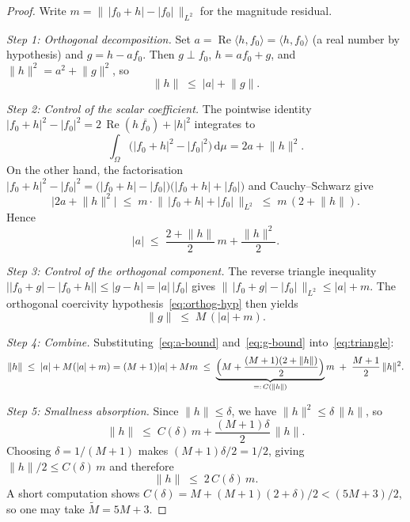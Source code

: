 \documentclass[11pt]{amsart}
\theoremstyle{definition}
\theoremstyle{remark}
\newcommand{\abs}[1]{\lvert #1 \rvert}
\newcommand{\norm}[1]{\lVert #1 \rVert}
\newcommand{\ip}[2]{\langle #1,#2\rangle}
\DeclareMathOperator{\re}{Re}
\newcommand{\dd}{\mathrm{d}}
\begin{document}
\begin{proof}
Write $m = \bigl\|\, \abs{f_0 + h} - \abs{f_0} \,\bigr\|_{L^2}$ for the
magnitude residual.

\medskip
\noindent
\emph{Step 1: Orthogonal decomposition.}\;
Set $a = \re\ip{h}{f_0} = \ip{h}{f_0}$ (a real number by hypothesis) and
$g = h - a f_0$.  Then $g \perp f_0$, $h = af_0 + g$, and
$\norm{h}^2 = a^2 + \norm{g}^2$, so
\begin{equation}\label{eq:triangle}
\norm{h} \;\le\; \abs{a} + \norm{g}.
\end{equation}

\medskip
\noindent
\emph{Step 2: Control of the scalar coefficient.}\;
The pointwise identity
$\abs{f_0 + h}^2 - \abs{f_0}^2
= 2\,\re(h\,\overline{f_0}) + \abs{h}^2$
integrates to
\[
\int_\Omega \bigl(\abs{f_0 + h}^2 - \abs{f_0}^2\bigr)\,\dd\mu
= 2a + \norm{h}^2.
\]
On the other hand, the factorisation
$\abs{f_0 + h}^2 - \abs{f_0}^2
= \bigl(\abs{f_0 + h} - \abs{f_0}\bigr)
  \bigl(\abs{f_0 + h} + \abs{f_0}\bigr)$
and Cauchy--Schwarz give
\[
\abs{2a + \norm{h}^2}
\;\le\;
m \cdot \bigl\|\, \abs{f_0 + h} + \abs{f_0} \,\bigr\|_{L^2}
\;\le\;
m\,(2 + \norm{h}).
\]
Hence
\begin{equation}\label{eq:a-bound}
\abs{a}
\;\le\;
\frac{2 + \norm{h}}{2}\, m
+ \frac{\norm{h}^2}{2}.
\end{equation}

\medskip
\noindent
\emph{Step 3: Control of the orthogonal component.}\;
The reverse triangle inequality
$\bigl\lvert \abs{f_0 + g} - \abs{f_0 + h} \bigr\rvert
\le \abs{g - h} = \abs{a}\,\abs{f_0}$
gives
$\bigl\|\, \abs{f_0 + g} - \abs{f_0} \,\bigr\|_{L^2}
\le \abs{a} + m$.
The orthogonal coercivity hypothesis~\eqref{eq:orthog-hyp} then yields
\begin{equation}\label{eq:g-bound}
\norm{g} \;\le\; M\,(\abs{a} + m).
\end{equation}

\medskip
\noindent
\emph{Step 4: Combine.}\;
Substituting~\eqref{eq:a-bound} and~\eqref{eq:g-bound}
into~\eqref{eq:triangle}:
\[
\norm{h}
\;\le\;
\abs{a} + M(\abs{a} + m)
= (M+1)\abs{a} + Mm
\;\le\;
\underbrace{\Bigl(M + \frac{(M+1)(2+\norm{h})}{2}\Bigr)}_{=:\, C(\norm{h})}
m
\;+\; \frac{M+1}{2}\,\norm{h}^2.
\]

\medskip
\noindent
\emph{Step 5: Smallness absorption.}\;
Since $\norm{h} \le \delta$, we have $\norm{h}^2 \le \delta\,\norm{h}$, so
\[
\norm{h}
\;\le\; C(\delta)\, m + \frac{(M+1)\delta}{2}\,\norm{h}.
\]
Choosing $\delta = 1/(M+1)$ makes $(M+1)\delta/2 = 1/2$, giving
$\norm{h}/2 \le C(\delta)\, m$ and therefore
\[
\norm{h} \;\le\; 2\, C(\delta)\, m.
\]
A short computation shows
$C(\delta) = M + (M+1)(2 + \delta)/2 < (5M+3)/2$, so one may take
$\widetilde{M} = 5M + 3$.
\end{proof}
\end{document}
